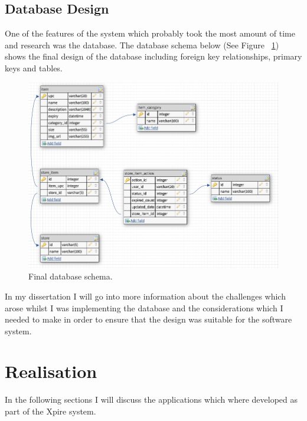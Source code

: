\documentclass[a4paper,11pt]{report}
\begin{document}
\section{Database Design}
One of the features of the system which probably took the most amount of time and research was the database.
The database schema below (See Figure ~\ref{fig:DBSchema}) shows the final design of the database including foreign key relationships, primary keys and tables.

\begin{figure}[H]
    \centering
    \includegraphics[width=12.5cm]{./assets/images/Database-Schema.png}
    \caption{Final database schema.}
    \label{fig:DBSchema}
\end{figure}

In my dissertation I will go into more information about the challenges which arose whilst I was implementing the database  and the considerations
which I needed to make in order to ensure that the design was suitable for the software system.


\chapter{Realisation}
In the following sections I will discuss the applications which where developed as part of the Xpire system.
\end{document}
